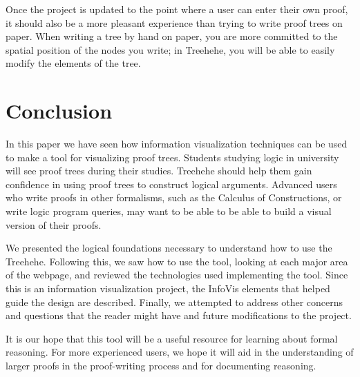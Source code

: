 \documentclass[journal]{vgtc}                %
\newcommand{\projectname}{Treehehe}
\begin{document}
Once the project is updated to the point where a user can enter their own proof, it should also be a more pleasant experience than trying to write proof trees on paper. When writing a tree by hand on paper, you are more committed to the spatial position of the nodes you write; in \projectname{}, you will be able to easily modify the elements of the tree.

\section{Conclusion}
\label{sec:conclusion}


In this paper we have seen how information visualization techniques can be used to make a tool for visualizing proof trees. Students studying logic in university will see proof trees during their studies. \projectname{} should help them gain confidence in using proof trees to construct logical arguments. Advanced users who write proofs in other formalisms, such as the Calculus of Constructions, or write logic program queries, may want to be able to be able to build a visual version of their proofs.

We presented the logical foundations necessary to understand how to use the \projectname{}. Following this, we saw how to use the tool, looking at each major area of the webpage, and reviewed the technologies used implementing the tool. Since this is an information visualization project, the InfoVis elements that helped guide the design are described. Finally, we attempted to address other concerns and questions that the reader might have and future modifications to the project.

It is our hope that this tool will be a useful resource for learning about formal reasoning. For more experienced users, we hope it will aid in the understanding of larger proofs in the proof-writing process and for documenting reasoning.



\end{document}

